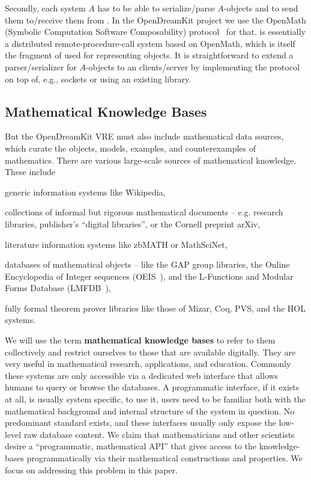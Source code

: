 Secondly, each system $A$ has to be able to serialize/parse $A$-objects and to send them to/receive them from \MMT.
In the OpenDreamKit project we use the OpenMath \SCSCP (Symbolic Computation Software Composability) protocol~\cite{SCSCP-1.3} for that. 
\SCSCP is essentially a distributed remote-procedure-call system based on OpenMath, which is itself the fragment of \OMMT used for representing objects.
It is straightforward to extend a parser/serializer for $A$-objects to an \SCSCP clients/server by implementing the \SCSCP protocol on top of, e.g., sockets or using an existing \SCSCP library. 


\subsection{Mathematical Knowledge Bases}\label{sec:mkb}

But the \textsf{OpenDreamKit} VRE must also include mathematical data sources, which
curate the objects, models, examples, and counterexamples of mathematics.  There are
various large-scale sources of mathematical knowledge.  These include
\begin{compactitem}
\item generic information systems like Wikipedia,
\item collections of informal but rigorous mathematical documents -- e.g. research libraries, publisher's ``digital libraries'', or the Cornell preprint arXiv,
\item literature information systems like zbMATH or MathSciNet,
\item databases of mathematical objects -- like the GAP group libraries, the Online Encyclopedia of Integer sequences (OEIS~\cite{Sloane:OEIS,oeis}), and the L-Functions and Modular Forms Database (LMFDB~\cite{Cremona:LMFDB16,lmfdb:on}),
\item fully formal theorem prover libraries like those of Mizar, Coq, PVS, and the HOL systems.
\end{compactitem}
  
We will use the term \textbf{mathematical knowledge bases} to refer to them collectively and restrict ourselves to those that are available digitally.
They are very useful in mathematical research, applications, and education.  
Commonly these systems are only accessible via a dedicated web interface that allows humans to query or browse the databases. 
A programmatic interface, if it exists at all, is usually system specific, to use it, users need to be familiar both with the mathematical background and internal structure of the system in question.  
No predominant standard exists, and these interfaces usually only expose the low-level raw database content.
We claim that mathematicians and other scientists desire a ``programmatic, mathematical API'' that gives access to the knowledge-bases programmatically via their mathematical constructions and properties. 
We focus on addressing this problem in this paper.

